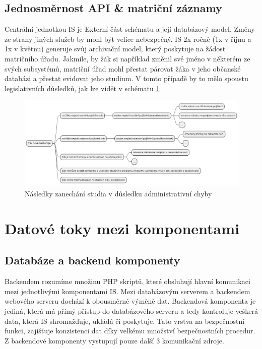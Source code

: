 \documentclass[FM,Proj]{tulthesis}
\begin{document}
\subsection*{Jednosměrnost API \& matriční záznamy}  
\label{section:jednosmernost-api-a-matricni-zaznamy}
Centrální jednotkou IS je Externí část schématu a její databázový model. Změny ze strany jiných služeb by mohl
být velice nebezpečný. IS 2x ročně (1x v říjnu a 1x v květnu) generuje svůj archivační model, který poskytuje
na žádost matričního úřadu.
Jakmile, by žák si například změnil své jméno v některém ze svých subsystémů, matriční úřad mohl přestat
párovat žáka v jeho občanské databázi a přestat evidovat jeho studium. V tomto případě by to mělo spoustu 
legislativních důsledků, jak lze vidět v schématu \ref{fig:dusledky-nestudia}

\begin{landscape}
    \begin{figure}[H]
        \centering
        \includegraphics[width=\linewidth]{dusledky-nestudia.png}
        \caption{Následky zanechání studia v důsledku administrativní chyby}
        \label{fig:dusledky-nestudia}
    \end{figure}
\end{landscape}

\section{Datové toky mezi komponentami}
\label{section:datove-toky-mezi-komponentami}
\subsection*{Databáze a backend komponenty}
Backendem rozumíme množinu PHP skriptů, které obsluhují hlavní komunikaci mezi 
jednotlivými komponentami IS.
Mezi databázovým serverem a backendem webového serveru dochází k obousměrné výměně
dat. Backendová komponenta je jediná, která má přímý přístup do databázového serveru
a tedy kontroluje veškerá data, která IS shromažďuje, ukládá či poskytuje. Tato
vrstva na bezpečnostní funkci, zajišťuje konzistenci dat díky velkému množství
bezpečnostních procedur. Z backendové komponenty vystupují pouze další 3 komunikační
zdroje.
\end{document}
